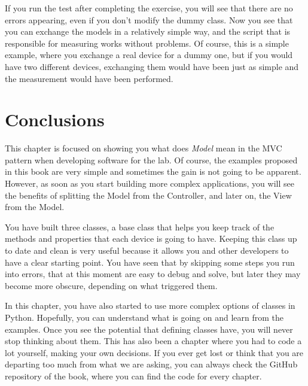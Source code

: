 
If you run the test after completing the exercise, you will see that
there are no errors appearing, even if you don't modify the dummy class.
Now you see that you can exchange the models in a relatively simple way,
and the script that is responsible for measuring works without problems.
Of course, this is a simple example, where you exchange a real device
for a dummy one, but if you would have two different devices, exchanging
them would have been just as simple and the measurement would have
been performed.


\section{Conclusions}\label{conclusions}
This chapter is focused on showing you what does \emph{Model} mean in
the {MVC} pattern when developing software for the lab. Of course, the
examples proposed in this book are very simple and sometimes the gain is
not going to be apparent. However, as soon as you start building more
complex applications, you will see the benefits of splitting the Model
from the Controller, and later on, the View from the Model.

You have built three classes, a base class that helps you keep track of
the methods and properties that each device is going to have. Keeping
this class up to date and clean is very useful because it allows you and
other developers to have a clear starting point. You have seen that by
skipping some steps you run into errors, that at this moment are easy to
debug and solve, but later they may become more obscure, depending on
what triggered them.

In this chapter, you have also started to use more complex options of
classes in Python. Hopefully, you can understand what is going on and
learn from the examples. Once you see the potential that defining
classes have, you will never stop thinking about them. This has also
been a chapter where you had to code a lot yourself, making your own
decisions. If you ever get lost or think that you are departing too much
from what we are asking, you can always check the GitHub repository of
the book, where you can find the code for every chapter.
